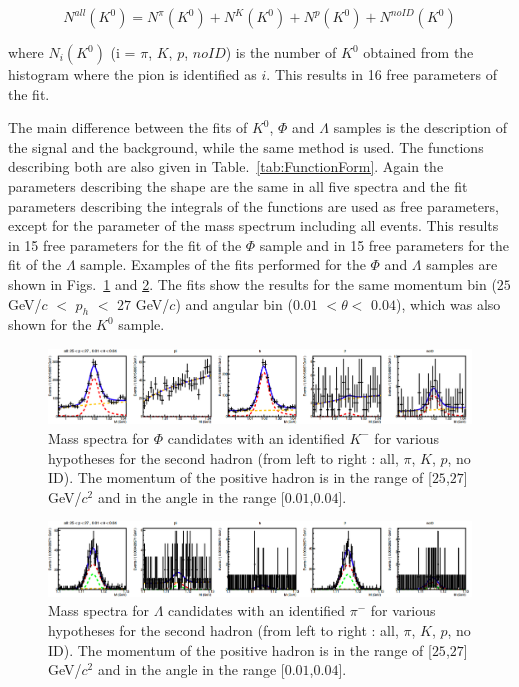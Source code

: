 \begin{equation}
  N^{all}(K^0) = N^{\pi}(K^0) + N^{K}(K^0) + N^{p}(K^0) + N^{noID}(K^0)
\end{equation}

where $N_i(K^0)$ (i = $\pi$, $K$, $p$, $noID$) is the number of $K^0$ obtained from the histogram where the pion is identified as $i$. This results in 16 free parameters of the fit.

The main difference between the fits of $K^0$, $\Phi$ and $\Lambda$ samples is the description of the signal and the background, while the same method is used. The functions describing both are also given in Table.~\ref{tab:FunctionForm}. Again the parameters describing the shape are the same in all five spectra and the fit parameters  describing the integrals of the functions are used as free parameters, except for the parameter of the mass spectrum including all events. This results in 15 free parameters for the fit of the $\Phi$ sample and in 15 free parameters for the fit of the $\Lambda$ sample. Examples of the fits performed for the $\Phi$ and $\Lambda$ samples are shown in Figs.~\ref{pic:PhiMassSpectra} and \ref{pic:LambdaMassSpectra}. The fits show the results for the same momentum bin ($25$ GeV/$c$ $<$ $p_h$ $<$ $27$ GeV/$c$) and angular bin ($0.01$ $< \theta <$ $0.04$), which was also shown for the $K^0$ sample.

\begin{figure}[!h]
  \centering
	\includegraphics[scale=0.3]{./gfx/PhiMassSpectra.png}
	\caption{Mass spectra for $\Phi$ candidates with an identified $K^-$ for various hypotheses for the second hadron (from left to right : all, $\pi$, $K$, $p$, no ID). The momentum of the positive hadron is in the range of [$25$,$27$] GeV/$c^2$ and in the angle in the range [$0.01$,$0.04$].}
	\label{pic:PhiMassSpectra}
\end{figure}

\begin{figure}[!h]
  \centering
	\includegraphics[scale=0.3]{./gfx/LambdaMassSpectra.png}
	\caption{Mass spectra for $\Lambda$ candidates with an identified $\pi^-$ for various hypotheses for the second hadron (from left to right : all, $\pi$, $K$, $p$, no ID). The momentum of the positive hadron is in the range of [$25$,$27$] GeV/$c^2$ and in the angle in the range [$0.01$,$0.04$].}
	\label{pic:LambdaMassSpectra}
\end{figure}

